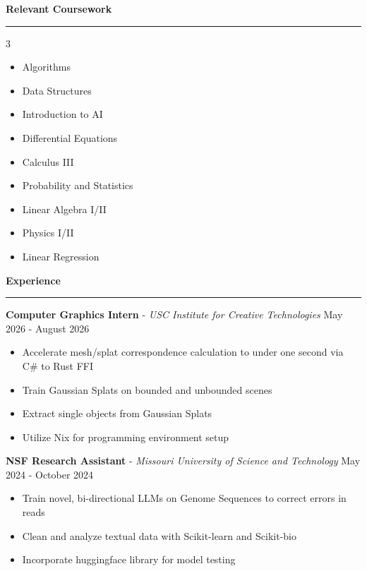 \documentclass[11pt]{article}
\begin{document}
\textbf{Relevant Coursework}\par
\vspace{-12pt}
\noindent\rule{\textwidth}{0.4pt}
\vspace{-24pt}  %
\begin{multicols}{3}
    \begin{itemize}[noitemsep, topsep=0pt, partopsep=0pt, parsep=0pt, itemsep=0pt]
        \small
        \item Algorithms
        \item Data Structures
        \item Introduction to AI
        \item Differential Equations
        \item Calculus III
        \item Probability and Statistics
        \item Linear Algebra I/II
        \item Physics I/II
        \item Linear Regression
    \end{itemize}
\end{multicols}
\vspace{-10pt}  %

\textbf{Experience}\par
\vspace{-12pt}
\noindent\rule{\textwidth}{0.4pt}

\textbf{Computer Graphics Intern} - \textsl{USC Institute for Creative Technologies} \hfill May 2026 - August 2026
\begin{itemize}[noitemsep, topsep=0pt, partopsep=0pt, parsep=0pt, itemsep=0pt]
    \small
    \item Accelerate mesh/splat correspondence calculation to under one second via C\# to Rust FFI
    \item Train Gaussian Splats on bounded and unbounded scenes
    \item Extract single objects from Gaussian Splats
    \item Utilize Nix for programming environment setup
\end{itemize}


\textbf{NSF Research Assistant} - \textsl{Missouri University of Science and Technology} \hfill May 2024 - October 2024
\begin{itemize}[noitemsep, topsep=0pt, partopsep=0pt, parsep=0pt, itemsep=0pt]
    \small
    \item Train novel, bi-directional LLMs on Genome Sequences to correct  errors in reads
    \item Clean and analyze textual data with Scikit-learn and Scikit-bio
    \item Incorporate huggingface library for model testing
\end{itemize}
\end{document}
